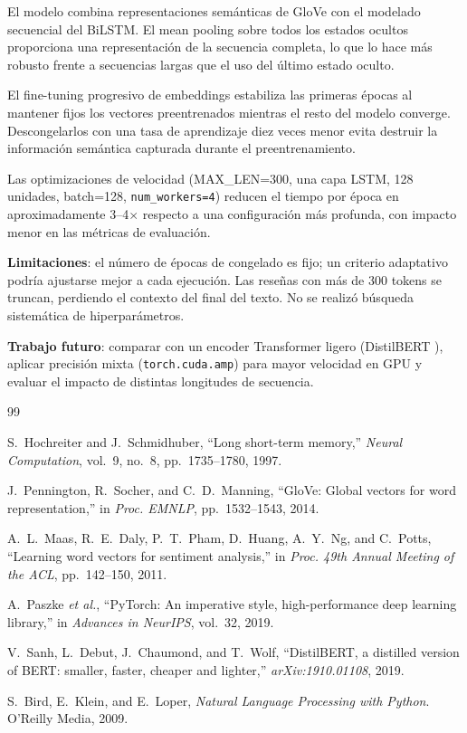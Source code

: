 \documentclass[letterpaper, 10 pt, conference]{ieeeconf}
\begin{document}
El modelo combina representaciones sem\'anticas de GloVe con el modelado
secuencial del BiLSTM. El mean pooling sobre todos los estados ocultos
proporciona una representaci\'on de la secuencia completa, lo que lo hace
m\'as robusto frente a secuencias largas que el uso del \'ultimo estado
oculto.

El fine-tuning progresivo de embeddings estabiliza las primeras \'epocas al
mantener fijos los vectores preentrenados mientras el resto del modelo
converge. Descongelarlos con una tasa de aprendizaje diez veces menor evita
destruir la informaci\'on sem\'antica capturada durante el preentrenamiento.

Las optimizaciones de velocidad (MAX\_LEN=300, una capa LSTM, 128 unidades,
batch=128, \texttt{num\_workers=4}) reducen el tiempo por \'epoca en
aproximadamente 3--4$\times$ respecto a una configuraci\'on m\'as profunda,
con impacto menor en las m\'etricas de evaluaci\'on.

\textbf{Limitaciones}: el n\'umero de \'epocas de congelado es fijo; un
criterio adaptativo podr\'ia ajustarse mejor a cada ejecuci\'on. Las
rese\~nas con m\'as de 300 tokens se truncan, perdiendo el contexto del
final del texto. No se realiz\'o b\'usqueda sistem\'atica de
hiperpar\'ametros.

\textbf{Trabajo futuro}: comparar con un encoder Transformer ligero
(DistilBERT \cite{sanh2019}), aplicar precisi\'on mixta
(\texttt{torch.cuda.amp}) para mayor velocidad en GPU y evaluar el impacto
de distintas longitudes de secuencia.

\clearpage

\begin{thebibliography}{99}

S.~Hochreiter and J.~Schmidhuber,
``Long short-term memory,''
\textit{Neural Computation}, vol.~9, no.~8, pp.~1735--1780, 1997.

J.~Pennington, R.~Socher, and C.~D.~Manning,
``GloVe: Global vectors for word representation,''
in \textit{Proc. EMNLP}, pp.~1532--1543, 2014.

A.~L.~Maas, R.~E.~Daly, P.~T.~Pham, D.~Huang, A.~Y.~Ng, and C.~Potts,
``Learning word vectors for sentiment analysis,''
in \textit{Proc. 49th Annual Meeting of the ACL}, pp.~142--150, 2011.

A.~Paszke \textit{et al.},
``PyTorch: An imperative style, high-performance deep learning library,''
in \textit{Advances in NeurIPS}, vol.~32, 2019.

V.~Sanh, L.~Debut, J.~Chaumond, and T.~Wolf,
``DistilBERT, a distilled version of BERT: smaller, faster, cheaper and
lighter,''
\textit{arXiv:1910.01108}, 2019.

S.~Bird, E.~Klein, and E.~Loper,
\textit{Natural Language Processing with Python}.
O'Reilly Media, 2009.

\end{thebibliography}
\end{document}
